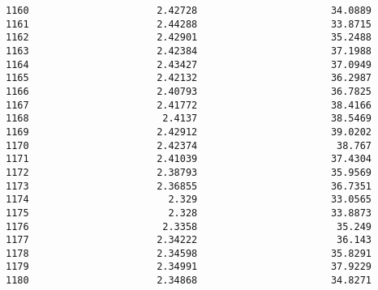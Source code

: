 \documentclass[11pt]{article}
\begin{document}
\begin{tcolorbox}[breakable, size=fbox, boxrule=.5pt, pad at break*=1mm, opacityfill=0]
\begin{Verbatim}[commandchars=\\\{\}]
1160                      2.42728                       34.0889
1161                      2.44288                       33.8715
1162                      2.42901                       35.2488
1163                      2.42384                       37.1988
1164                      2.43427                       37.0949
1165                      2.42132                       36.2987
1166                      2.40793                       36.7825
1167                      2.41772                       38.4166
1168                       2.4137                       38.5469
1169                      2.42912                       39.0202
1170                      2.42374                        38.767
1171                      2.41039                       37.4304
1172                      2.38793                       35.9569
1173                      2.36855                       36.7351
1174                        2.329                       33.0565
1175                        2.328                       33.8873
1176                       2.3358                        35.249
1177                      2.34222                        36.143
1178                      2.34598                       35.8291
1179                      2.34991                       37.9229
1180                      2.34868                       34.8271


\end{Verbatim}
\end{tcolorbox}
\end{document}
